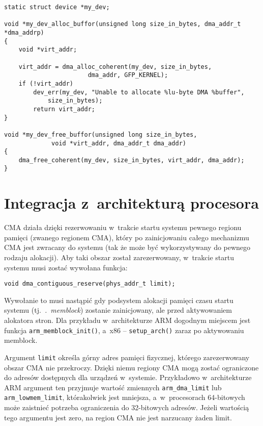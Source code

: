 \begin{lstlisting}[float=tbhp,caption={Alokacja bufora DMA z~użyciem
      DMA API.},label=lst:dma-alloc-example]
static struct device *my_dev;

void *my_dev_alloc_buffor(unsigned long size_in_bytes, dma_addr_t *dma_addrp)
{
	void *virt_addr;

	virt_addr = dma_alloc_coherent(my_dev, size_in_bytes,
				       dma_addr, GFP_KERNEL);
	if (!virt_addr)
		dev_err(my_dev, "Unable to allocate %lu-byte DMA %buffer",
			size_in_bytes);
		return virt_addr;
}

void *my_dev_free_buffor(unsigned long size_in_bytes,
			 void *virt_addr, dma_addr_t dma_addr)
{
	dma_free_coherent(my_dev, size_in_bytes, virt_addr, dma_addr);
}
\end{lstlisting}


\section{Integracja z~architekturą procesora}\label{sec:integrate-with-arch}

CMA działa dzięki rezerwowaniu w~trakcie startu systemu pewnego
regionu pamięci (zwanego regionem CMA), który po zainicjowaniu całego
mechanizmu CMA jest zwracany do systemu (tak że może być
wykorzystywany do pewnego rodzaju alokacji).  Aby taki obszar został
zarezerwowany, w~trakcie startu systemu musi zostać wywołana funkcja:

\begin{lstlisting}
void dma_contiguous_reserve(phys_addr_t limit);
\end{lstlisting}

Wywołanie to musi nastąpić gdy podsystem alokacji pamięci czasu startu
systemu (tj.\ {\it.\ memblock}) zostanie zainicjowany, ale przed
aktywowaniem alokatora stron.  Dla przykładu w~architekturze ARM
dogodnym miejscem jest funkcja \lstinline|arm_memblock_init()|, a~x86
-- \lstinline|setup_arch()| zaraz po aktywowaniu memblock.

Argument \lstinline|limit| określa górny adres pamięci fizycznej,
którego zarezerwowany obszar CMA nie przekroczy.  Dzięki niemu regiony
CMA mogą zostać ograniczone do adresów dostępnych dla urządzeń
w~systemie.  Przykładowo w~architekturze ARM argument ten przyjmuje
wartość zmiennych \lstinline|arm_dma_limit| lub
\lstinline|arm_lowmem_limit|, którakolwiek jest mniejsza,
a~w~procesorach 64-bitowych może zaistnieć potrzeba ograniczenia do
32-bitowych adresów.  Jeżeli wartością tego argumentu jest zero, na
region CMA nie jest narzucany żaden limit.

